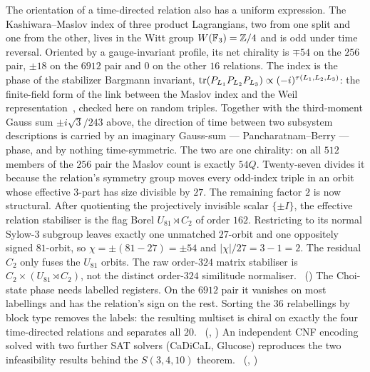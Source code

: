The orientation of a time-directed relation also has a uniform expression. The Kashiwara--Maslov index of three
product Lagrangians, two from one split and one from the other, lives in the Witt group $W(\mathbb{F}_3)=\mathbb{Z}/4$ and is
odd under time reversal. Oriented by a gauge-invariant profile, its net chirality is $\mp54$ on the $256$ pair,
$\pm18$ on the $6912$ pair and $0$ on the other $16$ relations. The index is the phase of the stabilizer Bargmann
invariant, $\operatorname{tr}(P_{L_1}P_{L_2}P_{L_3})\propto(-i)^{\tau(L_1,L_2,L_3)}$: the finite-field form of the link between the
Maslov index and the Weil representation~\cite{LionVergne1980}, checked here on random triples. Together with the
third-moment Gauss sum $\pm i\sqrt3/243$ above, the direction of time between two subsystem descriptions is carried by
an imaginary Gauss-sum --- Pancharatnam--Berry --- phase, and by nothing time-symmetric. The two are one chirality:
on all $512$ members of the $256$ pair the Maslov count is exactly $54Q$. Twenty-seven divides it because the relation's symmetry group moves every odd-index triple in an orbit whose effective $3$-part has size divisible by $27$. The remaining factor $2$ is now structural. After quotienting the projectively invisible scalar $\{\pm I\}$, the effective relation stabiliser is the flag Borel $U_{81}\rtimes C_2$ of order $162$. Restricting to its normal Sylow-$3$ subgroup leaves exactly one unmatched $27$-orbit and one oppositely signed $81$-orbit, so
$\chi=\pm(81-27)=\pm54$ and $|\chi|/27=3-1=2$. The residual $C_2$ only fuses the $U_{81}$ orbits. The raw order-$324$ matrix stabiliser is $C_2\times(U_{81}\rtimes C_2)$, not the distinct order-$324$ similitude normaliser.
\tierC\ () The Choi-state phase needs labelled
registers. On the $6912$ pair it vanishes on most labellings and has the relation's sign on the rest. Sorting the
$36$ relabellings by block type removes the labels: the resulting multiset is chiral on exactly the four
time-directed relations and separates all $20$. \tierC\ (,
) An independent CNF encoding
solved with two further SAT solvers (CaDiCaL, Glucose) reproduces the two infeasibility results behind the $S(3,4,10)$
theorem. \tierC\ (, )
